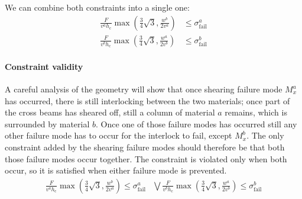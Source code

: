 We can combine both constraints into a single one:
\begin{align*}
	\frac{ F }{ v^a h_\text{c} }  \max{\left( \frac34 \sqrt{3}, \frac{w^b}{2v^a} \right)} &\le \sigma^a_\text{fail}  \\
	\frac{ F }{ v^b h_\text{c} }  \max{\left( \frac34 \sqrt{3}, \frac{w^a}{2 v^b} \right)} &\le \sigma^b_\text{fail}  
\end{align*}


\paragraph{Constraint validity}
A careful analysis of the geometry will show that once shearing failure mode $M_x^a$ has occurred, 
there is still interlocking between the two materials;
once part of the cross beams has sheared off, still a column of material $a$ remains, which is surrounded by material $b$.
Once one of those failure modes has occurred still any other failure mode has to occur for the interlock to fail, except $M_x^b$.
The only constraint added by the shearing failure modes should therefore be that both those failure modes occur together.
The constraint is violated only when both occur, so it is satisfied when either failure mode is prevented.
\begin{align*}
	\frac{ F }{ v^a h_\text{c} }  \max{\left( \frac34 \sqrt{3}, \frac{w^b}{2v^a} \right)} \le \sigma^a_\text{fail}  &\bigvee
	\frac{ F }{ v^b h_\text{c} }  \max{\left( \frac34 \sqrt{3}, \frac{w^a}{2v^b} \right)} \le \sigma^b_\text{fail}  
\end{align*}

